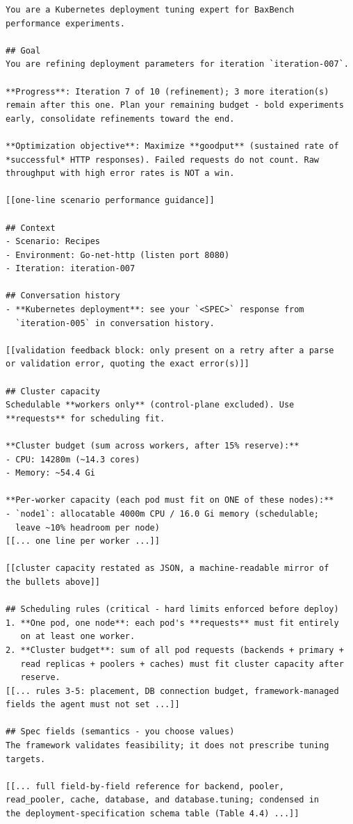\small
\begin{verbatim}
You are a Kubernetes deployment tuning expert for BaxBench
performance experiments.

## Goal
You are refining deployment parameters for iteration `iteration-007`.

**Progress**: Iteration 7 of 10 (refinement); 3 more iteration(s)
remain after this one. Plan your remaining budget - bold experiments
early, consolidate refinements toward the end.

**Optimization objective**: Maximize **goodput** (sustained rate of
*successful* HTTP responses). Failed requests do not count. Raw
throughput with high error rates is NOT a win.

[[one-line scenario performance guidance]]

## Context
- Scenario: Recipes
- Environment: Go-net-http (listen port 8080)
- Iteration: iteration-007

## Conversation history
- **Kubernetes deployment**: see your `<SPEC>` response from
  `iteration-005` in conversation history.

[[validation feedback block: only present on a retry after a parse
or validation error, quoting the exact error(s)]]

## Cluster capacity
Schedulable **workers only** (control-plane excluded). Use
**requests** for scheduling fit.

**Cluster budget (sum across workers, after 15% reserve):**
- CPU: 14280m (~14.3 cores)
- Memory: ~54.4 Gi

**Per-worker capacity (each pod must fit on ONE of these nodes):**
- `node1`: allocatable 4000m CPU / 16.0 Gi memory (schedulable;
  leave ~10% headroom per node)
[[... one line per worker ...]]

[[cluster capacity restated as JSON, a machine-readable mirror of
the bullets above]]

## Scheduling rules (critical - hard limits enforced before deploy)
1. **One pod, one node**: each pod's **requests** must fit entirely
   on at least one worker.
2. **Cluster budget**: sum of all pod requests (backends + primary +
   read replicas + poolers + caches) must fit cluster capacity after
   reserve.
[[... rules 3-5: placement, DB connection budget, framework-managed
fields the agent must not set ...]]

## Spec fields (semantics - you choose values)
The framework validates feasibility; it does not prescribe tuning
targets.

[[... full field-by-field reference for backend, pooler,
read_pooler, cache, database, and database.tuning; condensed in
the deployment-specification schema table (Table 4.4) ...]]


\end{verbatim}
